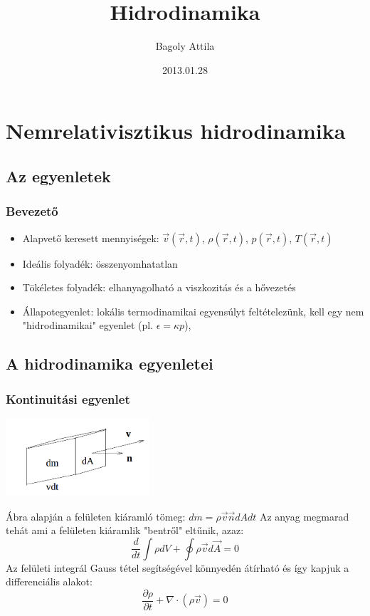 \documentclass{beamer}
\title{Hidrodinamika}
\author{Bagoly Attila}
\date{2013.01.28}
\institute{ELTE}
\begin{document}
\begin{frame}
  \titlepage
\end{frame}



\section{Nemrelativisztikus hidrodinamika}

\subsection{Az egyenletek}
\begin{frame}
\frametitle{Bevezető}
\begin{itemize}
\item Alapvető keresett mennyiségek: $\vec{v}(\vec{r},t)$, $\rho(\vec{r},t)$, $p(\vec{r},t)$, $T(\vec{r},t)$
\item Ideális folyadék: összenyomhatatlan
\item Tökéletes folyadék: elhanyagolható a viszkozitás és a hővezetés
\item Állapotegyenlet: lokális termodinamikai egyensúlyt feltételezünk, kell egy nem "hidrodinamikai" egyenlet (pl. $\epsilon=\kappa p$), 
\end{itemize}
\end{frame}


\subsection{A hidrodinamika egyenletei}

\begin{frame}
\frametitle{Kontinuitási egyenlet}
\begin{center}\includegraphics[width=0.40\textwidth]{pic/f1.png}\end{center}
Ábra alapján a felületen kiáramló tömeg: $dm=\rho \vec{v}\vec{n}dAdt$
Az anyag megmarad tehát ami a felületen kiáramlik "bentről" eltűnik, azaz: 
\begin{equation*}
\frac{d}{dt}\int \rho dV+\oint \rho \vec{v}d\vec{A}=0
\end{equation*}
Az felületi integrál Gauss tétel segítségével könnyedén átírható és így kapjuk a differenciális alakot: 
\begin{equation*}
\frac{\partial \rho}{\partial t}+\nabla \cdot (\rho \vec{v})=0
\end{equation*}
\end{frame}
\end{document}
